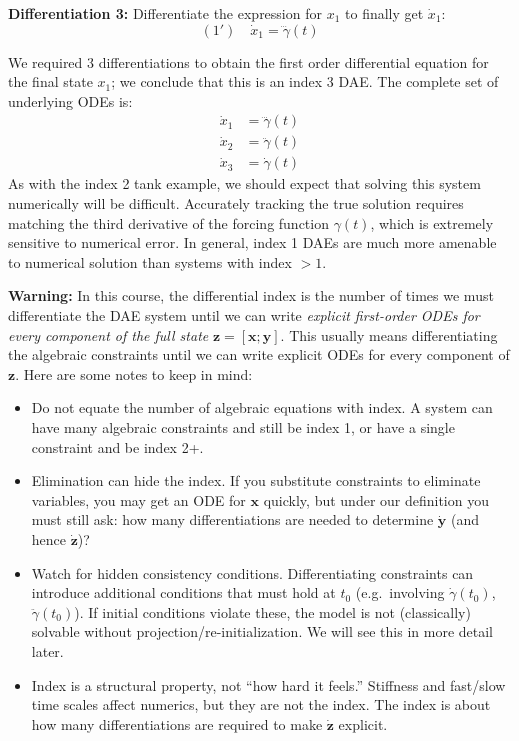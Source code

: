 \textbf{Differentiation 3:} Differentiate the expression for $x_1$ to finally get $\dot{x}_1$:
\begin{equation}
    (1') \quad \dot{x}_1 = \dddot{\gamma}(t)
\end{equation}

We required 3 differentiations to obtain the first order differential equation for the final state $x_1$; we conclude that this is an index 3 DAE. The complete set of underlying ODEs is:
\begin{align}
    \dot{x}_1 &= \dddot{\gamma}(t) \\
    \dot{x}_2 &= \ddot{\gamma}(t) \\
    \dot{x}_3 &= \dot{\gamma}(t)
\end{align}
As with the index 2 tank example, we should expect that solving this system numerically will be difficult. Accurately tracking the true solution requires matching the third derivative of the forcing function $\gamma(t)$, which is extremely sensitive to numerical error. In general, index 1 DAEs are much more amenable to numerical solution than systems with index $>1$.

\begin{warningBox}
\textbf{Warning:}
In this course, the differential index is the number of times we must differentiate the DAE system until we can write \emph{explicit first-order ODEs for every component of the full state} $\mathbf{z}=[\mathbf{x};\mathbf{y}]$. This usually means differentiating the algebraic constraints until we can write explicit ODEs for every component of $\mathbf{z}$. Here are some notes to keep in mind:

\begin{itemize}
    \item Do not equate the number of algebraic equations with index. A system can have many algebraic constraints and still be index 1, or have a single constraint and be index 2+.
    \item Elimination can hide the index. If you substitute constraints to eliminate variables, you may get an ODE for $\mathbf{x}$ quickly, but under our definition you must still ask: how many differentiations are needed to determine $\dot{\mathbf{y}}$ (and hence $\dot{\mathbf{z}}$)?
    \item Watch for hidden consistency conditions. Differentiating constraints can introduce additional conditions that must hold at $t_0$ (e.g.\ involving $\dot{\gamma}(t_0)$, $\ddot{\gamma}(t_0)$). If initial conditions violate these, the model is not (classically) solvable without projection/re-initialization. We will see this in more detail later.
    \item Index is a structural property, not ``how hard it feels.'' Stiffness and fast/slow time scales affect numerics, but they are not the index. The index is about how many differentiations are required to make $\dot{\mathbf{z}}$ explicit.
\end{itemize}
\end{warningBox}

